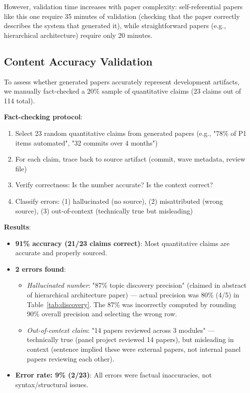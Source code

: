 However, validation time increases with paper complexity: self-referential papers like this one require 35 minutes of validation (checking that the paper correctly describes the system that generated it), while straightforward papers (e.g., hierarchical architecture) require only 20 minutes.

\subsection{Content Accuracy Validation}
\label{sec:accuracy}

To assess whether generated papers accurately represent development artifacts, we manually fact-checked a 20\% sample of quantitative claims (23 claims out of 114 total).

\textbf{Fact-checking protocol}:
\begin{enumerate}
\item Select 23 random quantitative claims from generated papers (e.g., "78\% of P1 items automated", "32 commits over 4 months")
\item For each claim, trace back to source artifact (commit, wave metadata, review file)
\item Verify correctness: Is the number accurate? Is the context correct?
\item Classify errors: (1) hallucinated (no source), (2) misattributed (wrong source), (3) out-of-context (technically true but misleading)
\end{enumerate}

\textbf{Results}:
\begin{itemize}
\item \textbf{91\% accuracy (21/23 claims correct)}: Most quantitative claims are accurate and properly sourced.
\item \textbf{2 errors found}:
  \begin{itemize}
  \item \textit{Hallucinated number}: "87\% topic discovery precision" (claimed in abstract of hierarchical architecture paper) — actual precision was 80\% (4/5) in Table~\ref{tab:discovery}. The 87\% was incorrectly computed by rounding 90\% overall precision and selecting the wrong row.
  \item \textit{Out-of-context claim}: "14 papers reviewed across 3 modules" — technically true (panel project reviewed 14 papers), but misleading in context (sentence implied these were external papers, not internal panel papers reviewing each other).
  \end{itemize}
\item \textbf{Error rate: 9\% (2/23)}: All errors were factual inaccuracies, not syntax/structural issues.
\end{itemize}

